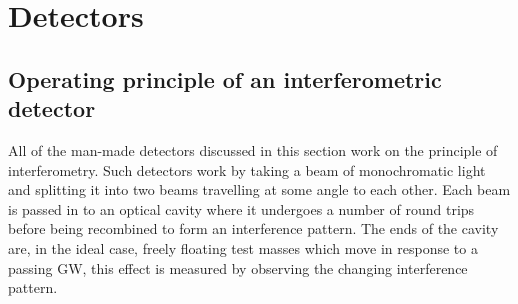 \section{Detectors}\label{sec:detectors}

\subsection{Operating principle of an interferometric detector}\label{sec:principles}

All of the man-made detectors discussed in this section work on the principle of interferometry. Such detectors work by taking a beam of monochromatic light and splitting it into two beams travelling at some angle to each other. Each beam is passed in to an optical cavity where it undergoes a number of round trips before being recombined to form an interference pattern. The ends of the cavity are, in the ideal case, freely floating test masses which move in response to a passing GW, this effect is measured by observing the changing interference pattern. %

